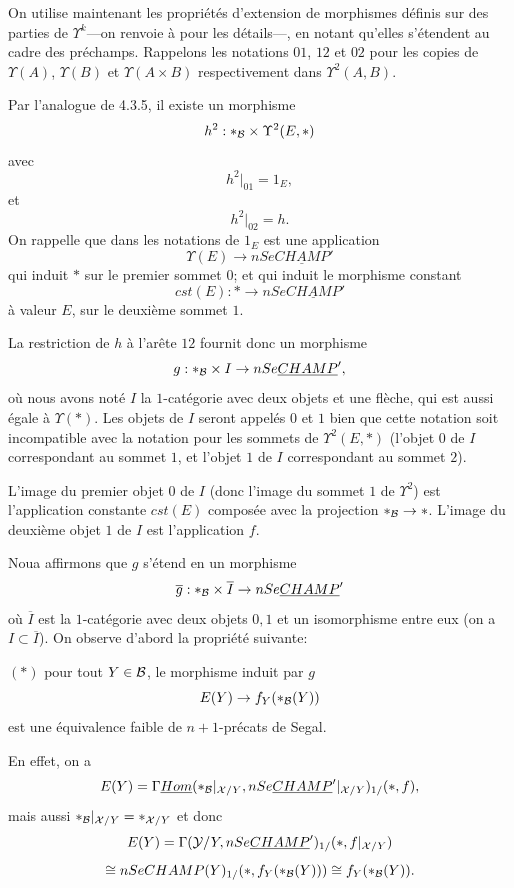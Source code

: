 \documentclass[12pt]{article}
\newcommand{\Bb}{{\cal B}}
\newcommand{\Xx}{{\cal X}}
\newcommand{\Yy}{{\cal Y}}
\begin{document}
On utilise maintenant les propri\'et\'es d'extension de morphismes d\'efinis
sur des parties de $\Upsilon ^k$---on
renvoie \`a \cite{limits} pour les d\'etails---,
en notant qu'elles s'\'etendent au cadre des pr\'echamps.
Rappelons les notations $01$, $12$ et $02$ pour les copies de $\Upsilon (A)$,
$\Upsilon (B)$ et $\Upsilon (A\times B)$ respectivement dans $\Upsilon ^2(A,B)$.

Par l'analogue de \cite{limits} 4.3.5, il existe un morphisme
$$
h^2: \ast _{\Bb} \times \Upsilon ^2(E,\ast )
$$
avec
$$
h^2|_{01} = 1_E,
$$
et
$$
h^2|_{02} = h.
$$
On rappelle que dans les notations de \cite{limits}
$1_E$ est une application
$$
\Upsilon (E) \rightarrow nSe\underline{CHAMP}'
$$
qui induit $\ast$ sur le premier sommet $0$; et
qui induit le morphisme constant
$$
cst(E) :\ast \rightarrow nSe\underline{CHAMP}'
$$
\`a valeur $E$, sur le deuxi\`eme sommet $1$.

La restriction de $h$ \`a l'ar\^ete $12$ fournit donc un morphisme
$$
g: \ast _{\Bb} \times I \rightarrow nSe\underline{CHAMP}',
$$
o\`u nous avons not\'e $I$ la $1$-cat\'egorie avec deux objets et une fl\`eche,
qui est aussi \'egale \`a $\Upsilon (\ast )$.
Les objets de $I$ seront appel\'es $0$ et $1$ bien que cette notation soit
incompatible avec la notation pour les sommets de $\Upsilon ^2(E,\ast )$
(l'objet $0$ de $I$ correspondant au sommet $1$,
et l'objet $1$ de $I$ correspondant au
sommet $2$).

L'image du premier objet $0$ de $I$ (donc l'image du sommet $1$ de
$\Upsilon ^2$)
est l'application constante $cst(E)$ compos\'ee avec la projection $\ast
_{\Bb}\rightarrow \ast$. L'image
du deuxi\`eme objet $1$ de $I$ est l'application $f$.

Noua affirmons que $g$ s'\'etend en un morphisme
$$
\overline{g}: \ast _{\Bb} \times \overline{I} \rightarrow
nSe\underline{CHAMP}'
$$
o\`u $\overline{I}$ est la $1$-cat\'egorie avec deux objets $0,1$ et un
isomorphisme entre eux (on a $I\subset \overline{I}$). On
observe d'abord la propri\'et\'e suivante:

$(\ast
)$ pour tout
$Y\in \Bb$, le morphisme induit par $g$
$$
E(Y)\rightarrow f_Y(\ast _{\Bb}(Y))
$$
est une \'equivalence faible de $n+1$-pr\'ecats de Segal.

En effet, on a
$$
E(Y)= \Gamma \underline{Hom}(\ast _{\Bb }|_{\Xx /Y},
nSe\underline{CHAMP}'|_{\Xx /Y})_{1/}(\ast , f),
$$
mais aussi $\ast _{\Bb }|_{\Xx /Y}=\ast _{\Xx /Y}$ et donc
$$
E(Y)= \Gamma (\Yy /Y, nSe\underline{CHAMP}')_{1/}(\ast , f|_{\Xx /Y})
$$
$$
\cong nSeCHAMP (Y)_{1/}(\ast , f_Y(\ast _{\Bb}(Y))) \cong
f_Y(\ast _{\Bb}(Y)).
$$
\end{document}
